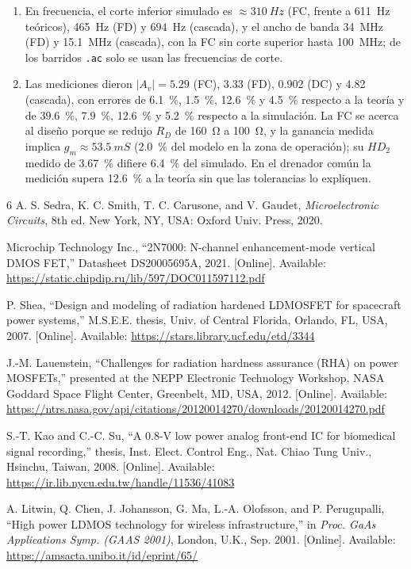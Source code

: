 \documentclass[conference]{IEEEtran}
\newcommand{\gm}{g_m}
\begin{document}
\begin{enumerate}
\item En frecuencia, el corte inferior simulado es $\approx\SI{310}{Hz}$ (FC, frente a \SI{611}{Hz} teóricos), \SI{465}{Hz} (FD) y \SI{694}{Hz} (cascada), y el ancho de banda \SI{34}{MHz} (FD) y \SI{15.1}{MHz} (cascada), con la FC sin corte superior hasta \SI{100}{MHz}; de los barridos \texttt{.ac} solo se usan las frecuencias de corte.
\item Las mediciones dieron $|A_v|=5.29$ (FC), 3.33 (FD), 0.902 (DC) y 4.82 (cascada), con errores de \SI{6.1}{\percent}, \SI{1.5}{\percent}, \SI{12.6}{\percent} y \SI{4.5}{\percent} respecto a la teoría y de \SI{39.6}{\percent}, \SI{7.9}{\percent}, \SI{12.6}{\percent} y \SI{5.2}{\percent} respecto a la simulación. La FC se acerca al diseño porque se redujo $R_D$ de \SI{160}{\ohm} a \SI{100}{\ohm}, y la ganancia medida implica $\gm\approx\SI{53.5}{mS}$ (\SI{2.0}{\percent} del modelo en la zona de operación); su $HD_2$ medido de \SI{3.67}{\percent} difiere \SI{6.4}{\percent} del simulado. En el drenador común la medición supera \SI{12.6}{\percent} a la teoría sin que las tolerancias lo expliquen.
\end{enumerate}

\begin{thebibliography}{6}
 A. S. Sedra, K. C. Smith, T. C. Carusone, and V. Gaudet, \emph{Microelectronic Circuits}, 8th ed. New York, NY, USA: Oxford Univ. Press, 2020.

 Microchip Technology Inc., ``2N7000: N-channel enhancement-mode vertical DMOS FET,'' Datasheet DS20005695A, 2021. [Online]. Available: \url{https://static.chipdip.ru/lib/597/DOC011597112.pdf}

 P. Shea, ``Design and modeling of radiation hardened LDMOSFET for spacecraft power systems,'' M.S.E.E. thesis, Univ. of Central Florida, Orlando, FL, USA, 2007. [Online]. Available: \url{https://stars.library.ucf.edu/etd/3344}

 J.-M. Lauenstein, ``Challenges for radiation hardness assurance (RHA) on power MOSFETs,'' presented at the NEPP Electronic Technology Workshop, NASA Goddard Space Flight Center, Greenbelt, MD, USA, 2012. [Online]. Available: \url{https://ntrs.nasa.gov/api/citations/20120014270/downloads/20120014270.pdf}

 S.-T. Kao and C.-C. Su, ``A 0.8-V low power analog front-end IC for biomedical signal recording,'' thesis, Inst. Elect. Control Eng., Nat. Chiao Tung Univ., Hsinchu, Taiwan, 2008. [Online]. Available: \url{https://ir.lib.nycu.edu.tw/handle/11536/41083}

 A. Litwin, Q. Chen, J. Johansson, G. Ma, L.-A. Olofsson, and P. Perugupalli, ``High power LDMOS technology for wireless infrastructure,'' in \emph{Proc. GaAs Applications Symp. (GAAS 2001)}, London, U.K., Sep. 2001. [Online]. Available: \url{https://amsacta.unibo.it/id/eprint/65/}
\end{thebibliography}
\end{document}
